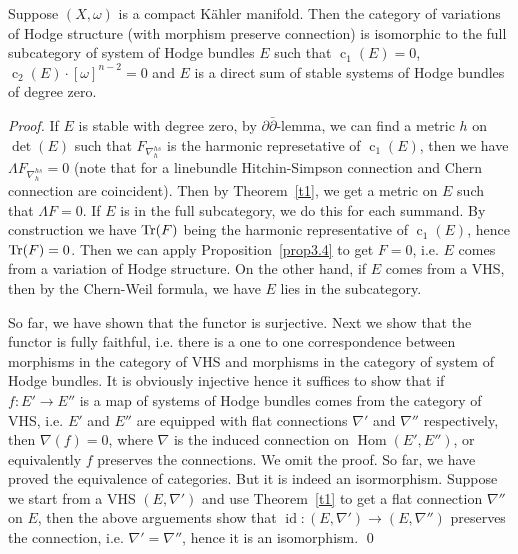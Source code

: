 \documentclass[aspectratio=169, 10pt]{beamer}
\theoremstyle{definition}
\theoremstyle{example}
\begin{document}
	\begin{frame}[allowframebreaks]
		\begin{theorem}
			Suppose $(X,\omega)$ is a compact K\"ahler manifold. Then the category of variations of Hodge structure (with morphism preserve connection) is isomorphic to the full subcategory of system of Hodge bundles $E$ such that $\operatorname{c}_1(E)=0$, $\operatorname{c}_2(E)\cdot [\omega]^{n-2}=0$ and $E$ is a direct sum of stable systems of Hodge bundles of degree zero.
		\end{theorem}
		\noindent \textit{Proof.} 
		If $E$ is stable with degree zero, by $\partial\bar{\partial}$-lemma, we can find a metric $h$ on $\det(E)$ such that $F_{\nabla_{h}^{hs}}$ is the harmonic represetative of $\operatorname{c}_1(E)$, then we have $\Lambda F_{\nabla_{h}^{hs}}=0$ (note that for a linebundle Hitchin-Simpson connection and Chern connection are coincident). Then by Theorem~\ref{t1}, we get a metric on $E$ such that $\Lambda F=0$. If $E$ is in the full subcategory, we do this for each summand. By construction we have $\operatorname{Tr}(F)$ being the harmonic representative of $\operatorname{c}_1(E)$, hence $\operatorname{Tr}(F)=0$. Then we can apply Proposition~\ref{prop3.4} to get $F=0$, i.e. $E$ comes from a variation of Hodge structure. On the other hand, if $E$ comes from a VHS, then by the Chern-Weil formula, we have $E$ lies in the subcategory. 
		
		So far, we have shown that the functor is surjective. Next we show that the functor is fully faithful, i.e. there is a one to one correspondence between morphisms in the category of VHS and morphisms in the category of system of Hodge bundles. It is obviously injective hence it suffices to show that if $f: E'\to E''$ is a map of systems of Hodge bundles comes from the category of VHS, i.e. $E'$ and $E''$ are equipped with flat connections $\nabla'$ and $\nabla''$ respectively, then $\nabla(f)=0$, where $\nabla$ is the induced connection on $\operatorname{Hom}(E',E'')$, or equivalently $f$ preserves the connections. We omit the proof. So far, we have proved the equivalence of categories. But it is indeed an isormorphism. Suppose we start from a VHS $(E, \nabla')$ and use Theorem~\ref{t1} to get a flat connection $\nabla''$ on $E$, then the above arguements show that $\operatorname{id}: (E, \nabla')\to (E, \nabla'')$ preserves the connection, i.e. $\nabla'=\nabla''$, hence it is an isomorphism. \hfill \qed
	\end{frame}
\end{document}
